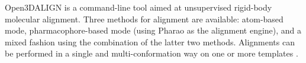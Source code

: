 Open3DALIGN is a command-line tool aimed at unsupervised rigid-body molecular alignment. Three methods for alignment are available: atom-based mode, pharmacophore-based mode (using Pharao as the alignment engine), and a mixed fashion using the combination of the latter two methods. Alignments can be performed in a single and multi-conformation way on one or more templates \cite{Tosco_2011}.